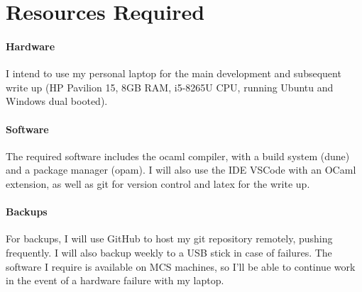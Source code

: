 \section*{Resources Required}

\paragraph*{Hardware}
I intend to use my personal laptop for the main development and subsequent write up (HP Pavilion 15, 8GB RAM, i5-8265U CPU, running Ubuntu and Windows dual booted).

\paragraph*{Software}
The required software includes the ocaml compiler, with a build system (dune) and a package manager (opam). I will also use the IDE VSCode with an OCaml extension, as well as git for version control and latex for the write up.

\paragraph*{Backups}
For backups, I will use GitHub to host my git repository remotely, pushing frequently. I will also backup weekly to a USB stick in case of failures. The software I require is available on MCS machines, so I'll be able to continue work in the event of a hardware failure with my laptop.

